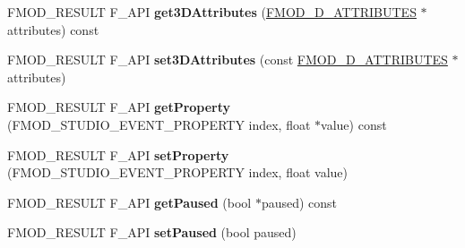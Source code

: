 \begin{DoxyCompactItemize}
\item 
\hypertarget{class_f_m_o_d_1_1_studio_1_1_event_instance_acadeee3ceb33e2d235f564c828645206}{F\+M\+O\+D\+\_\+\+R\+E\+S\+U\+L\+T F\+\_\+\+A\+P\+I {\bfseries get3\+D\+Attributes} (\hyperlink{struct_f_m_o_d__3_d___a_t_t_r_i_b_u_t_e_s}{F\+M\+O\+D\+\_\+D\+\_\+\+A\+T\+T\+R\+I\+B\+U\+T\+E\+S} $\ast$attributes) const }\label{class_f_m_o_d_1_1_studio_1_1_event_instance_acadeee3ceb33e2d235f564c828645206}

\item 
\hypertarget{class_f_m_o_d_1_1_studio_1_1_event_instance_a8123a7be145637030b9e3e54da227ddf}{F\+M\+O\+D\+\_\+\+R\+E\+S\+U\+L\+T F\+\_\+\+A\+P\+I {\bfseries set3\+D\+Attributes} (const \hyperlink{struct_f_m_o_d__3_d___a_t_t_r_i_b_u_t_e_s}{F\+M\+O\+D\+\_\+D\+\_\+\+A\+T\+T\+R\+I\+B\+U\+T\+E\+S} $\ast$attributes)}\label{class_f_m_o_d_1_1_studio_1_1_event_instance_a8123a7be145637030b9e3e54da227ddf}

\item 
\hypertarget{class_f_m_o_d_1_1_studio_1_1_event_instance_a2f087be105f3dda6ccd9f6bd41847fd3}{F\+M\+O\+D\+\_\+\+R\+E\+S\+U\+L\+T F\+\_\+\+A\+P\+I {\bfseries get\+Property} (F\+M\+O\+D\+\_\+\+S\+T\+U\+D\+I\+O\+\_\+\+E\+V\+E\+N\+T\+\_\+\+P\+R\+O\+P\+E\+R\+T\+Y index, float $\ast$value) const }\label{class_f_m_o_d_1_1_studio_1_1_event_instance_a2f087be105f3dda6ccd9f6bd41847fd3}

\item 
\hypertarget{class_f_m_o_d_1_1_studio_1_1_event_instance_a36a3f227464e9781627c43609ae942d4}{F\+M\+O\+D\+\_\+\+R\+E\+S\+U\+L\+T F\+\_\+\+A\+P\+I {\bfseries set\+Property} (F\+M\+O\+D\+\_\+\+S\+T\+U\+D\+I\+O\+\_\+\+E\+V\+E\+N\+T\+\_\+\+P\+R\+O\+P\+E\+R\+T\+Y index, float value)}\label{class_f_m_o_d_1_1_studio_1_1_event_instance_a36a3f227464e9781627c43609ae942d4}

\item 
\hypertarget{class_f_m_o_d_1_1_studio_1_1_event_instance_a8e598977c7be3e60a5b41f0e47934a8c}{F\+M\+O\+D\+\_\+\+R\+E\+S\+U\+L\+T F\+\_\+\+A\+P\+I {\bfseries get\+Paused} (bool $\ast$paused) const }\label{class_f_m_o_d_1_1_studio_1_1_event_instance_a8e598977c7be3e60a5b41f0e47934a8c}

\item 
\hypertarget{class_f_m_o_d_1_1_studio_1_1_event_instance_a2ced2e548da2f1c448a760c27c1dd1fa}{F\+M\+O\+D\+\_\+\+R\+E\+S\+U\+L\+T F\+\_\+\+A\+P\+I {\bfseries set\+Paused} (bool paused)}\label{class_f_m_o_d_1_1_studio_1_1_event_instance_a2ced2e548da2f1c448a760c27c1dd1fa}


\end{DoxyCompactItemize}
